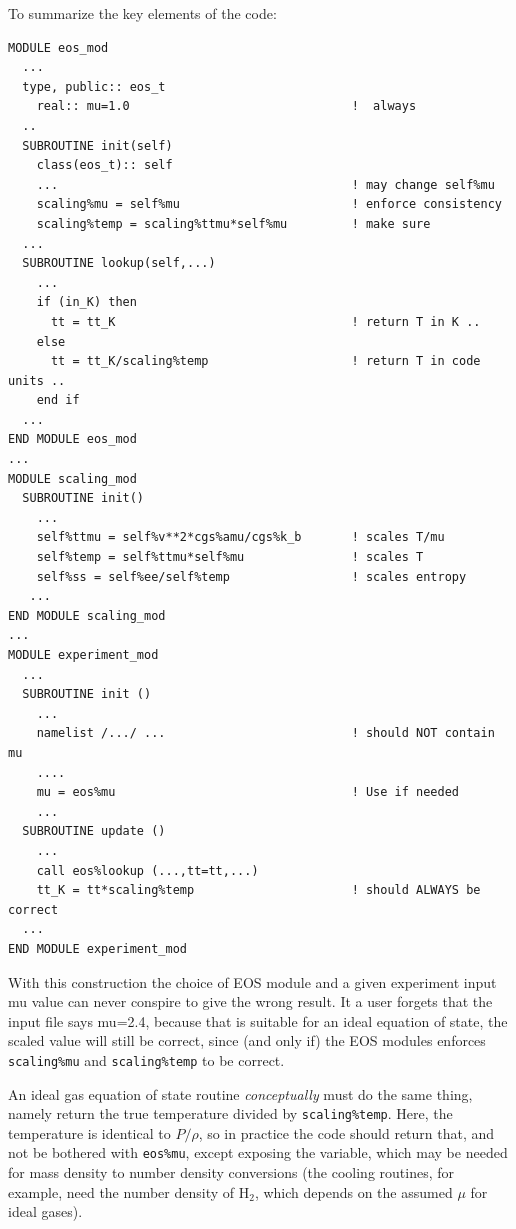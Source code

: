 \documentclass[paper=a4,fontsize=11pt]{scrartcl}
\numberwithin{equation}{section}		%
\numberwithin{figure}{section}			%
\numberwithin{table}{section}				%
\newcommand{\codecolor}{\color{Blue}}
\newcommand{\Code}[1]{{\codecolor\texttt{#1}}}
\begin{document}
To summarize the key elements of the code:
{\small\codecolor\begin{verbatim}
MODULE eos_mod
  ...
  type, public:: eos_t
    real:: mu=1.0                               !  always
  ..
  SUBROUTINE init(self)
    class(eos_t):: self
    ...                                         ! may change self%mu
    scaling%mu = self%mu                        ! enforce consistency
    scaling%temp = scaling%ttmu*self%mu         ! make sure
  ...
  SUBROUTINE lookup(self,...)
    ...
    if (in_K) then
      tt = tt_K                                 ! return T in K ..
    else
      tt = tt_K/scaling%temp                    ! return T in code units ..
    end if
  ...
END MODULE eos_mod
...
MODULE scaling_mod
  SUBROUTINE init()
    ...
    self%ttmu = self%v**2*cgs%amu/cgs%k_b       ! scales T/mu
    self%temp = self%ttmu*self%mu               ! scales T
    self%ss = self%ee/self%temp                 ! scales entropy
   ...
END MODULE scaling_mod
...
MODULE experiment_mod
  ...
  SUBROUTINE init ()
    ...
    namelist /.../ ...                          ! should NOT contain mu
    ....
    mu = eos%mu                                 ! Use if needed
    ...
  SUBROUTINE update ()
    ...
    call eos%lookup (...,tt=tt,...)
    tt_K = tt*scaling%temp                      ! should ALWAYS be correct
  ...
END MODULE experiment_mod
\end{verbatim}}
With this construction the choice of EOS module and a given experiment input mu value can never conspire to give the wrong result.   It a user forgets that the input file says mu=2.4, because that is suitable for an ideal equation of state, the scaled value will still be correct, since (and only if) the EOS modules enforces \Code{scaling\%mu} and \Code{scaling\%temp} to be correct.

An ideal gas equation of state routine \textit{conceptually} must do the same thing, namely return the true temperature divided by \Code{scaling\%temp}.  Here, the temperature is identical to $P/\rho$, so in practice the code should return that, and not be bothered with \Code{eos\%mu}, except exposing the variable, which may be needed for mass density to number density conversions (the cooling routines, for example, need the number density of $\mathrm{H}_2$, which depends on the assumed $\mu$ for ideal gases).
\end{document}
